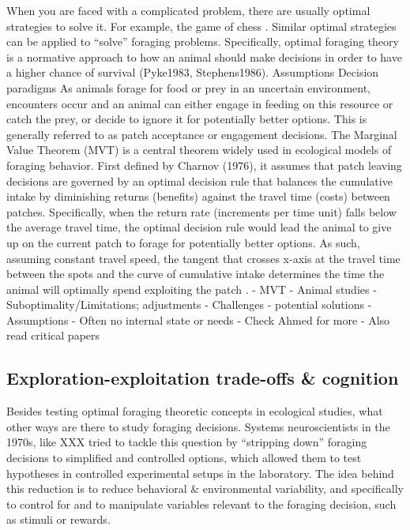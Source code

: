 When you are faced with a complicated problem, there are usually optimal strategies to solve it. For example, the game of chess . Similar optimal strategies can be applied to “solve” foraging problems. Specifically, optimal foraging theory is a normative approach to how an animal should make decisions in order to have a higher chance of survival \needscite(Pyke1983, Stephens1986).
Assumptions
Decision paradigms
As animals forage for food or prey in an uncertain environment, encounters occur and an animal can either engage in feeding on this resource or catch the prey, or decide to ignore it for potentially better options. This is generally referred to as patch acceptance or engagement decisions.
The Marginal Value Theorem (MVT) is a central theorem widely used in ecological models of foraging behavior. First defined by \needscite Charnov (1976), it assumes that patch leaving decisions are governed by an optimal decision rule that balances the cumulative intake by diminishing returns (benefits) against the travel time (costs) between patches. Specifically, when the return rate (increments per time unit) falls below the average travel time, the optimal decision rule would lead the animal to give up on the current patch to forage for potentially better options. As such, assuming constant travel speed, the tangent that crosses x-axis at the travel time between the spots and the curve of cumulative intake determines the time the animal will optimally spend exploiting the patch  .
- MVT
- Animal studies
- Suboptimality/Limitations; adjustments
- Challenges - potential solutions
- Assumptions
- Often no internal state or needs
- Check Ahmed for more
- Also read critical papers


\subsection{Exploration-exploitation trade-offs \& cognition}
\label{sub:exploreexploit}

Besides testing optimal foraging theoretic concepts in ecological studies, what other ways are there to study foraging decisions. Systems neuroscientists in the 1970s, like XXX tried to tackle this question by “stripping down” foraging decisions to simplified and controlled options, which allowed them to test hypotheses in controlled experimental setups in the laboratory. The idea behind this reduction is to reduce behavioral \& environmental variability, and specifically to control for and to manipulate variables relevant to the foraging decision, such as stimuli or rewards.

